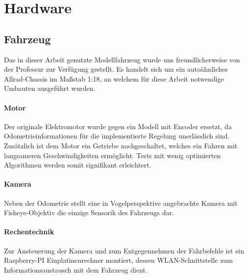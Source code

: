 \section{Hardware}
\subsection{Fahrzeug}
Das in dieser Arbeit genutzte Modellfahrzeug wurde uns freundlicherweise von der Professur zur Verfügung gestellt. Es handelt sich um ein autoähnliches Allrad-Chassis im Maßstab 1:18, an welchem für diese Arbeit notwendige Umbauten ausgeführt wurden.
\paragraph{Motor}
Der originale Elektromotor wurde gegen ein Modell mit Encoder ersetzt, da Odometrieinformationen für die implementierte Regelung unerlässlich sind. Zusätzlich ist dem Motor ein Getriebe nachgeschaltet, welches ein Fahren mit langsameren Geschwindigkeiten ermöglicht. Tests mit wenig optimierten Algorithmen werden somit signifikant erleichtert.
\paragraph{Kamera}
Neben der Odometrie stellt eine in Vogelperspektive angebrachte Kamera mit Fisheye-Objektiv die einzige Sensorik des Fahrzeugs dar.
\paragraph{Rechentechnik}
Zur Ansteuerung der Kamera und zum Entgegennehmen der Fahrbefehle ist ein Raspberry-PI Einplatinenrechner montiert, dessen WLAN-Schnittstelle zum Informationsaustausch mit dem Fahrzeug dient.
